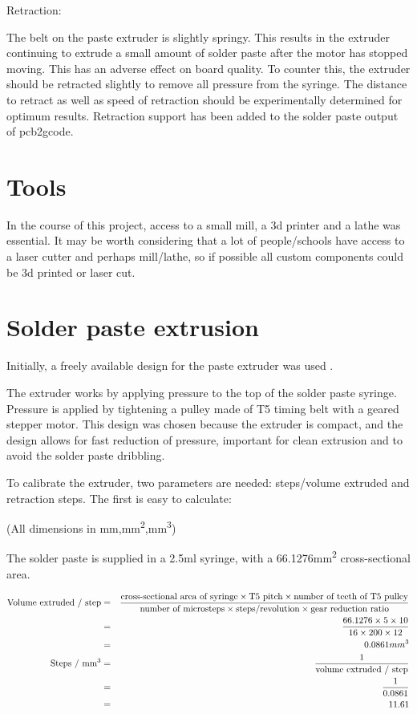 Retraction:

The belt on the paste extruder is slightly springy. This results in the extruder continuing to extrude a small amount of solder paste after the motor has stopped moving.
This has an adverse effect on board quality. To counter this, the extruder should be retracted slightly to remove all pressure from the syringe. The distance to retract
as well as speed of retraction should be experimentally determined for optimum results. Retraction support has been added to the solder paste output of pcb2gcode.

\section{Tools}
In the course of this project, access to a small mill, a 3d printer and a lathe was essential. It may be worth considering that a lot of people/schools have
access to a laser cutter and perhaps mill/lathe, so if possible all custom components could be 3d printed or 
laser cut.

\section{Solder paste extrusion}
Initially, a freely available design for the paste extruder was used \cite{thingipaste}.

The extruder works by applying pressure to the top of the solder paste syringe. Pressure is applied by tightening a pulley made
of T5 timing belt with a geared stepper motor. This design was chosen because the extruder is compact, and the design allows for
fast reduction of pressure, important for clean extrusion and to avoid the solder paste dribbling. 

To calibrate the extruder, two parameters are needed: steps/volume extruded and retraction steps. The first is easy to calculate:

(All dimensions in mm,mm\textsuperscript{2},mm\textsuperscript{3})

The solder paste is supplied in a 2.5ml syringe, with a 66.1276mm\textsuperscript{2} cross-sectional area.

\begin{eqnarray}
\text{Volume extruded / step} &=& \frac{\text{cross-sectional area of syringe} \times \text{T5 pitch} \times \text{number of teeth of T5 pulley}}{\text{number of microsteps} \times \text{steps/revolution} \times \text{gear reduction ratio}} \nonumber \\
&=&\frac{66.1276 \times 5 \times 10}{16 \times 200 \times 12} \nonumber \\
&=&0.0861mm\textsuperscript{3} \nonumber \\
	\text{Steps / mm\textsuperscript{3}} &=& \frac{1} {\text{volume extruded / step}} \nonumber \\
	&=& \frac{1}{ 0.0861} \nonumber \\
	&=& 11.61 \nonumber
\end{eqnarray}

